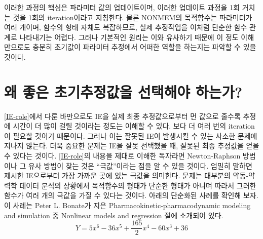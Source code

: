 \documentclass[
  11pt,
  krantz2, a4paper, twoside]{krantz}
\theoremstyle{definition}
\theoremstyle{definition}
\theoremstyle{definition}
\theoremstyle{remark}
\begin{document}
이러한 과정의 핵심은 파라미터 값의 업데이트이며, 이러한 업데이트 과정을 1회 거치는 것을 1회의 iteration이라고 지칭한다. 물론 NONMEM의 목적함수는 파라미터가 여러 개이며, 함수의 형태 자체도 복잡하므로, 실제 추정작업을 이처럼 단순한 함수 관계로 나타내기는 어렵다. 그러나 기본적인 원리는 이와 유사하기 때문에 이 정도 이해만으로도 충분히 초기값이 파라미터 추정에서 어떠한 역할을 하는지는 파악할 수 있을 것이다.

\hypertarget{uxc65c-uxc88buxc740-uxcd08uxae30uxcd94uxc815uxac12uxc744-uxc120uxd0dduxd574uxc57c-uxd558uxb294uxac00}{%
\section{왜 좋은 초기추정값을 선택해야 하는가?}\label{uxc65c-uxc88buxc740-uxcd08uxae30uxcd94uxc815uxac12uxc744-uxc120uxd0dduxd574uxc57c-uxd558uxb294uxac00}}

\ref{IE-role}에서 다룬 바만으로도 IE을 실제 최종 추정값으로부터 먼 값으로 줄수록 추정에 시간이 더 많이 걸릴 것이라는 정도는 이해할 수 있다. 보다 더 여러 번의 iteration이 필요할 것이기 때문이다. 그러나 이는 잘못된 IE이 발생시킬 수 있는 사소한 문제에 지나지 않는다. 더욱 중요한 문제는 IE을 잘못 선택했을 때, 잘못된 최종 추정값을 얻을 수 있다는 것이다. \ref{IE-role}의 내용을 제대로 이해한 독자라면 Newton-Raphson 방법이나 그 유사 방법이 찾는 것은 ``극값''이라는 점을 알 수 있을 것이다. 엄밀히 말하면 제시한 IE으로부터 가장 가까운 곳에 있는 극값을 의미한다. 문제는 대부분의 약동-약력학 데이터 분석의 상황에서 목적함수의 형태가 단순한 형태가 아니며 따라서 그러한 함수가 여러 개의 극값을 가질 수 있다는 것이다. 아래의 단순화된 사례를 확인해 보자. 이 사례는 Peter L. Bonate가 지은 Pharmacokinetic-pharmacodynamic modeling and simulation 중 Nonlinear models and regression 절에 소개되어 있다.
\begin{equation}
Y = 5x^6 - 36x^5 + \frac{165}{2}x^4 - 60x^3 + 36
\label{eq:multiplepoles}
\end{equation}
\end{document}
